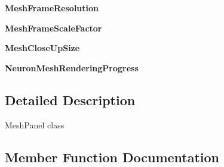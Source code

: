 \begin{DoxyCompactItemize}
\item 
{\bfseries Mesh\+Frame\+Resolution}\hypertarget{classmeshy_1_1neuromorphovis_1_1interface_1_1ui_1_1mesh__panel_1_1MeshPanel_aadf62c2540d4f8da2f3beffbbf294743}{}\label{classmeshy_1_1neuromorphovis_1_1interface_1_1ui_1_1mesh__panel_1_1MeshPanel_aadf62c2540d4f8da2f3beffbbf294743}

\item 
{\bfseries Mesh\+Frame\+Scale\+Factor}\hypertarget{classmeshy_1_1neuromorphovis_1_1interface_1_1ui_1_1mesh__panel_1_1MeshPanel_ace30fd7e2e5981c0ec6717701693c7d7}{}\label{classmeshy_1_1neuromorphovis_1_1interface_1_1ui_1_1mesh__panel_1_1MeshPanel_ace30fd7e2e5981c0ec6717701693c7d7}

\item 
{\bfseries Mesh\+Close\+Up\+Size}\hypertarget{classmeshy_1_1neuromorphovis_1_1interface_1_1ui_1_1mesh__panel_1_1MeshPanel_a8e8872f32a4e877acbba73a23da7c099}{}\label{classmeshy_1_1neuromorphovis_1_1interface_1_1ui_1_1mesh__panel_1_1MeshPanel_a8e8872f32a4e877acbba73a23da7c099}

\item 
{\bfseries Neuron\+Mesh\+Rendering\+Progress}\hypertarget{classmeshy_1_1neuromorphovis_1_1interface_1_1ui_1_1mesh__panel_1_1MeshPanel_a80cb43a60aed716961a2e99cacfd78b0}{}\label{classmeshy_1_1neuromorphovis_1_1interface_1_1ui_1_1mesh__panel_1_1MeshPanel_a80cb43a60aed716961a2e99cacfd78b0}

\end{DoxyCompactItemize}


\subsection{Detailed Description}


\begin{DoxyVerb}MeshPanel class\end{DoxyVerb}
 

\subsection{Member Function Documentation}
